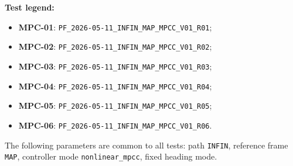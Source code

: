 \noindent
\textbf{Test legend:}
\begin{itemize}
    \item \textbf{MPC-01}: \texttt{PF\_2026-05-11\_INFIN\_MAP\_MPCC\_V01\_R01};
    \item \textbf{MPC-02}: \texttt{PF\_2026-05-11\_INFIN\_MAP\_MPCC\_V01\_R02};
    \item \textbf{MPC-03}: \texttt{PF\_2026-05-11\_INFIN\_MAP\_MPCC\_V01\_R03};
    \item \textbf{MPC-04}: \texttt{PF\_2026-05-11\_INFIN\_MAP\_MPCC\_V01\_R04};
    \item \textbf{MPC-05}: \texttt{PF\_2026-05-11\_INFIN\_MAP\_MPCC\_V01\_R05};
    \item \textbf{MPC-06}: \texttt{PF\_2026-05-11\_INFIN\_MAP\_MPCC\_V01\_R06}.
\end{itemize}

The following parameters are common to all tests: path \texttt{INFIN}, reference frame
\texttt{MAP}, controller mode \texttt{nonlinear\_mpcc}, fixed heading mode.

